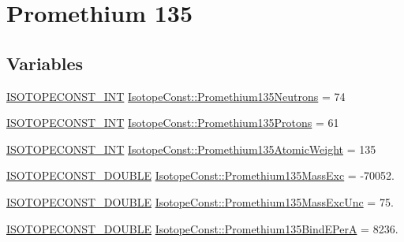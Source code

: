 \hypertarget{group___isotope_const-_promethium-_pm135}{}\section{Promethium 135}
\label{group___isotope_const-_promethium-_pm135}
\subsection*{Variables}
\begin{DoxyCompactItemize}
\item 
\mbox{\hyperlink{group___isotope_const-_macros_ga5f18360b3e99483a35c32d789e62621c}{I\+S\+O\+T\+O\+P\+E\+C\+O\+N\+S\+T\+\_\+\+I\+NT}} \mbox{\hyperlink{group___isotope_const-_promethium-_pm135_ga27c557631f6b8aefa6d8d7ffdb8e8cdb}{Isotope\+Const\+::\+Promethium135\+Neutrons}} = 74
\item 
\mbox{\hyperlink{group___isotope_const-_macros_ga5f18360b3e99483a35c32d789e62621c}{I\+S\+O\+T\+O\+P\+E\+C\+O\+N\+S\+T\+\_\+\+I\+NT}} \mbox{\hyperlink{group___isotope_const-_promethium-_pm135_ga3dc6d7ca76d5f506b784fecc058c6a11}{Isotope\+Const\+::\+Promethium135\+Protons}} = 61
\item 
\mbox{\hyperlink{group___isotope_const-_macros_ga5f18360b3e99483a35c32d789e62621c}{I\+S\+O\+T\+O\+P\+E\+C\+O\+N\+S\+T\+\_\+\+I\+NT}} \mbox{\hyperlink{group___isotope_const-_promethium-_pm135_gaae97f82ad14896394fdf1dc1ae7e6169}{Isotope\+Const\+::\+Promethium135\+Atomic\+Weight}} = 135
\item 
\mbox{\hyperlink{group___isotope_const-_macros_ga8f45a7272ce02c0b4c65c44636ed719a}{I\+S\+O\+T\+O\+P\+E\+C\+O\+N\+S\+T\+\_\+\+D\+O\+U\+B\+LE}} \mbox{\hyperlink{group___isotope_const-_promethium-_pm135_ga00820983401e6d86ffb165fb0806e308}{Isotope\+Const\+::\+Promethium135\+Mass\+Exc}} = -\/70052.
\item 
\mbox{\hyperlink{group___isotope_const-_macros_ga8f45a7272ce02c0b4c65c44636ed719a}{I\+S\+O\+T\+O\+P\+E\+C\+O\+N\+S\+T\+\_\+\+D\+O\+U\+B\+LE}} \mbox{\hyperlink{group___isotope_const-_promethium-_pm135_ga6f98633ad0066580e66981f97fb5e16e}{Isotope\+Const\+::\+Promethium135\+Mass\+Exc\+Unc}} = 75.
\item 
\mbox{\hyperlink{group___isotope_const-_macros_ga8f45a7272ce02c0b4c65c44636ed719a}{I\+S\+O\+T\+O\+P\+E\+C\+O\+N\+S\+T\+\_\+\+D\+O\+U\+B\+LE}} \mbox{\hyperlink{group___isotope_const-_promethium-_pm135_gaa5fda070d0d7d74e0930f354bebad69c}{Isotope\+Const\+::\+Promethium135\+Bind\+E\+PerA}} = 8236.

\end{DoxyCompactItemize}
